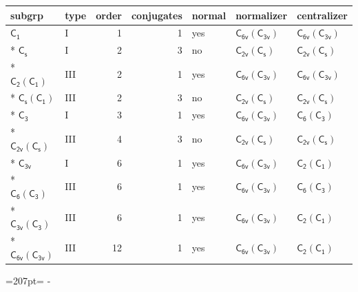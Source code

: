 \documentclass[10pt,a4paper]{article}
\newcommand{\needspace}[1]{\par\penalty-100\begingroup\dimen0=#1\relax\dimen2=\pagegoal
  \advance\dimen2-\pagetotal\ifdim\dimen0>\dimen2\relax\ifdim\dimen2>0pt\vfil\break\fi\fi
  \endgroup}
\numberwithin{equation}{section}
\newcommand{\grp}[1]{\mathsf{#1}}
\begin{document}
{\small\begin{longtable}{@{}llrrlll@{}}\toprule
subgrp & type & order & conjugates & normal & normalizer & centralizer\\\midrule\endhead
\bottomrule\endfoot\endlastfoot
\href{../../../rotation/data/pdf/C1.pdf}{$\grp{C_{1}}$} & I & 1 & 1 & yes & \href{C6v-C3v.pdf}{$\grp{C_{6v}}(\grp{C_{3v}})$} & \href{C6v-C3v.pdf}{$\grp{C_{6v}}(\grp{C_{3v}})$}\\*
\href{../../../rotation/data/pdf/C1v.pdf}{$\grp{C_{s}}$} & I & 2 & 3 & no & \href{C2v-C1v.pdf}{$\grp{C_{2v}}(\grp{C_{s}})$} & \href{C2v-C1v.pdf}{$\grp{C_{2v}}(\grp{C_{s}})$}\\*
\href{C2-C1.pdf}{$\grp{C_{2}}(\grp{C_{1}})$} & III & 2 & 1 & yes & \href{C6v-C3v.pdf}{$\grp{C_{6v}}(\grp{C_{3v}})$} & \href{C6v-C3v.pdf}{$\grp{C_{6v}}(\grp{C_{3v}})$}\\*
\href{C1v-C1.pdf}{$\grp{C_{s}}(\grp{C_{1}})$} & III & 2 & 3 & no & \href{C2v-C1v.pdf}{$\grp{C_{2v}}(\grp{C_{s}})$} & \href{C2v-C1v.pdf}{$\grp{C_{2v}}(\grp{C_{s}})$}\\*
\href{../../../rotation/data/pdf/C3.pdf}{$\grp{C_{3}}$} & I & 3 & 1 & yes & \href{C6v-C3v.pdf}{$\grp{C_{6v}}(\grp{C_{3v}})$} & \href{C6-C3.pdf}{$\grp{C_{6}}(\grp{C_{3}})$}\\*
\href{C2v-C1v.pdf}{$\grp{C_{2v}}(\grp{C_{s}})$} & III & 4 & 3 & no & \href{C2v-C1v.pdf}{$\grp{C_{2v}}(\grp{C_{s}})$} & \href{C2v-C1v.pdf}{$\grp{C_{2v}}(\grp{C_{s}})$}\\*
\href{../../../rotation/data/pdf/C3v.pdf}{$\grp{C_{3v}}$} & I & 6 & 1 & yes & \href{C6v-C3v.pdf}{$\grp{C_{6v}}(\grp{C_{3v}})$} & \href{C2-C1.pdf}{$\grp{C_{2}}(\grp{C_{1}})$}\\*
\href{C6-C3.pdf}{$\grp{C_{6}}(\grp{C_{3}})$} & III & 6 & 1 & yes & \href{C6v-C3v.pdf}{$\grp{C_{6v}}(\grp{C_{3v}})$} & \href{C6-C3.pdf}{$\grp{C_{6}}(\grp{C_{3}})$}\\*
\href{C3v-C3.pdf}{$\grp{C_{3v}}(\grp{C_{3}})$} & III & 6 & 1 & yes & \href{C6v-C3v.pdf}{$\grp{C_{6v}}(\grp{C_{3v}})$} & \href{C2-C1.pdf}{$\grp{C_{2}}(\grp{C_{1}})$}\\*
\href{C6v-C3v.pdf}{$\grp{C_{6v}}(\grp{C_{3v}})$} & III & 12 & 1 & yes & \href{C6v-C3v.pdf}{$\grp{C_{6v}}(\grp{C_{3v}})$} & \href{C2-C1.pdf}{$\grp{C_{2}}(\grp{C_{1}})$}\\
\bottomrule\end{longtable}}
\needspace{207pt}
\end{document}
